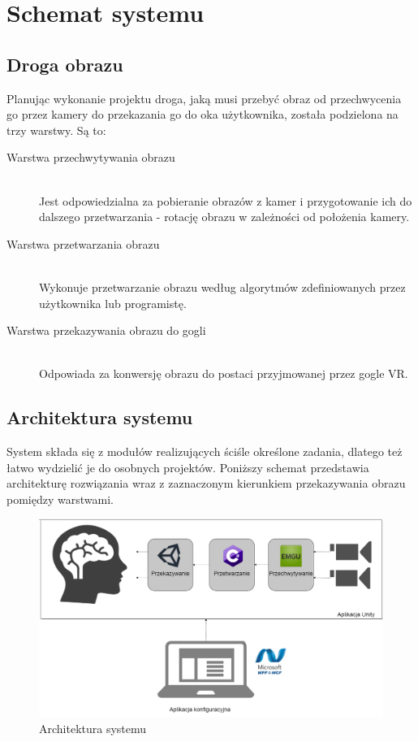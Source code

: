 \documentclass[a4paper,11pt,twoside]{report}
\theoremstyle{definition}
\begin{document}
\section{Schemat systemu}

\subsection{Droga obrazu}
Planując wykonanie projektu droga, jaką musi przebyć obraz od przechwycenia go przez kamery do przekazania go do oka użytkownika, została podzielona na trzy warstwy. Są to:

\begin{description}
\item [Warstwa przechwytywania obrazu] \hfill \\ Jest odpowiedzialna za pobieranie obrazów z kamer i przygotowanie ich do dalszego przetwarzania - rotację obrazu w zależności od położenia kamery.
\item [Warstwa przetwarzania obrazu] \hfill \\ Wykonuje przetwarzanie obrazu według algorytmów zdefiniowanych przez użytkownika lub programistę.
\item [Warstwa przekazywania obrazu do gogli] \hfill \\ Odpowiada za konwersję obrazu do postaci przyjmowanej przez gogle VR.
\end{description}

\subsection{Architektura systemu}
System składa się z modułów realizujących ściśle określone zadania, dlatego też łatwo wydzielić je do osobnych projektów. Poniższy schemat przedstawia architekturę rozwiązania wraz z zaznaczonym kierunkiem przekazywania obrazu pomiędzy warstwami. 

\begin{figure}[h]
\centering
\includegraphics[scale=0.3]{images/architecture_schema}
\caption[Architektura systemu]{Architektura systemu}
\end{figure}
\end{document}
